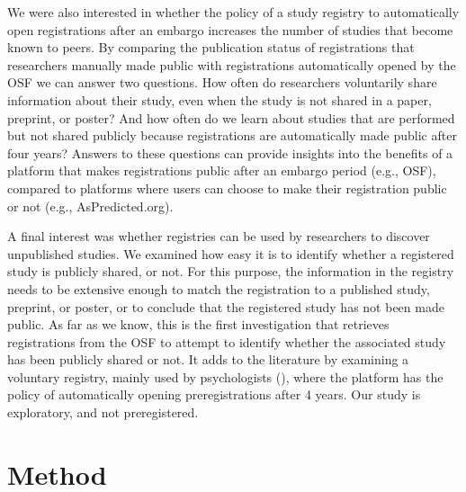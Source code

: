 \documentclass[
  ,man, a4paper,floatsintext]{apa6}
\begin{document}
We were also interested in whether the policy of a study registry to automatically open registrations after an embargo increases the number of studies that become known to peers. By comparing the publication status of registrations that researchers manually made public with registrations automatically opened by the OSF we can answer two questions. How often do researchers voluntarily share information about their study, even when the study is not shared in a paper, preprint, or poster? And how often do we learn about studies that are performed but not shared publicly because registrations are automatically made public after four years? Answers to these questions can provide insights into the benefits of a platform that makes registrations public after an embargo period (e.g., OSF), compared to platforms where users can choose to make their registration public or not (e.g., AsPredicted.org).

A final interest was whether registries can be used by researchers to discover unpublished studies. We examined how easy it is to identify whether a registered study is publicly shared, or not. For this purpose, the information in the registry needs to be extensive enough to match the registration to a published study, preprint, or poster, or to conclude that the registered study has not been made public. As far as we know, this is the first investigation that retrieves registrations from the OSF to attempt to identify whether the associated study has been publicly shared or not. It adds to the literature by examining a voluntary registry, mainly used by psychologists (), where the platform has the policy of automatically opening preregistrations after 4 years. Our study is exploratory, and not preregistered.

\section{Method}\label{method}
\end{document}
